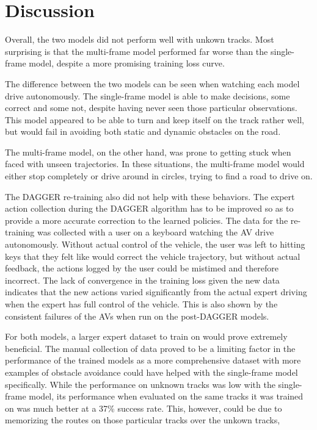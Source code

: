 \documentclass[conference]{IEEEtran}
\begin{document}
\section{Discussion}
Overall, the two models did not perform well with unkown tracks. Most surprising is that the 
multi-frame model performed far worse than the single-frame model, despite a more promising
training loss curve. \par
The difference between the two models can be seen when watching each model drive autonomously. 
The single-frame model is able to make decisions, some correct and some not, despite having never 
seen those particular observations. This model appeared to be able to turn and keep itself on the
track rather well, but would fail in avoiding both static and dynamic obstacles on the road. \par
The multi-frame model, on the other hand, was prone to getting
stuck when faced with unseen trajectories. In these situations, the multi-frame model would either 
stop completely or drive around in circles, trying to find a road to drive on. \par
The DAGGER re-training also did not help with these behaviors. The expert action collection 
during the DAGGER algorithm has to be improved so as to provide a more accurate correction to the 
learned policies. The data for the re-training was collected with a user on a keyboard watching 
the AV drive autonomously. Without actual control of the vehicle, the user was left to hitting keys 
that they felt like would correct the vehicle trajectory, but without actual feedback, the actions
logged by the user could be mistimed and therefore incorrect. The lack of convergence in the training 
loss given the new data indicates that the new actions varied significantly from the actual expert driving
when the expert has full control of the vehicle. This is also shown by the consistent failures of the 
AVs when run on the post-DAGGER models. \par
For both models, a larger expert dataset to train on would prove extremely beneficial. The manual
collection of data proved to be a limiting factor in the performance of the trained models as a more 
comprehensive dataset with more examples of obstacle avoidance could have helped with the single-frame
model specifically. While the performance on unknown tracks was low with the single-frame model,
its performance when evaluated on the same tracks it was trained on was much better at a 37\% success rate.
This, however, could be due to memorizing the routes on those particular tracks over the unkown tracks,
\end{document}
